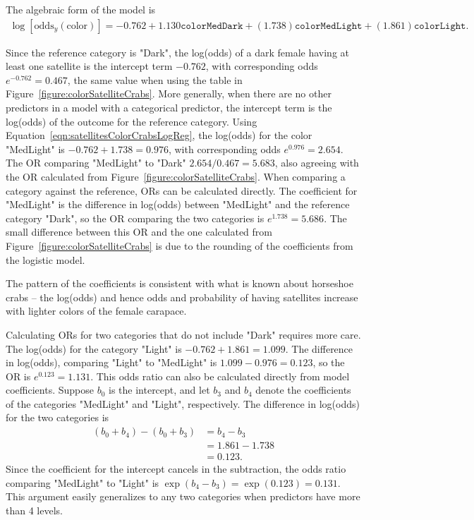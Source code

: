 The algebraic form of the model is
\begin{align}
\log\left[\text{odds}_{y}(\text{color})\right] = -0.762 + 1.130\texttt{colorMedDark}
 + (1.738)\texttt{colorMedLight} + (1.861)\texttt{colorLight}.
 \label{eqn:satellitesColorCrabsLogReg}
\end{align}

Since the reference category is "Dark", the log(odds) of a dark female having at least one satellite is the intercept term $-0.762$, with corresponding odds $e^{-0.762} = 0.467$, the same value when using the table in Figure~\ref{figure:colorSatelliteCrabs}.  More generally, when there are no other predictors in a model with a categorical predictor, the intercept term is the log(odds) of the outcome for the reference category. Using Equation~\ref{eqn:satellitesColorCrabsLogReg}, the log(odds) for the color "MedLight" is $-0.762 + 1.738 = 0.976$, with corresponding odds $e^{0.976} = 2.654$. The OR comparing "MedLight" to "Dark" $2.654/0.467 = 5.683$, also agreeing with the OR calculated from Figure~\ref{figure:colorSatelliteCrabs}.  When comparing a category against the reference, ORs can be calculated directly.  The coefficient for "MedLight" is the difference in log(odds) between "MedLight" and the reference category "Dark", so the OR comparing the two categories is $e^{1.738} = 5.686$.  The small difference between this OR and the one calculated from Figure~\ref{figure:colorSatelliteCrabs} is due to the rounding of the coefficients from the logistic model.


The pattern of the coefficients is consistent with what is known about horseshoe crabs -- the log(odds) and hence odds and probability of having satellites increase with lighter colors of the female carapace.

Calculating ORs for two categories that do not include "Dark" requires more care.  The log(odds) for the category "Light" is $-0.762 + 1.861 = 1.099$.  The difference in log(odds), comparing "Light" to "MedLight" is $1.099 - 0.976 = 0.123$, so the OR is $e^{0.123} = 1.131$.  This odds ratio can also be calculated directly from model coefficients.  Suppose $b_0$ is the intercept, and let $b_3$ and $b_4$ denote the coefficients of the categories "MedLight" and "Light", respectively.  The difference in log(odds) for the two categories is
\begin{align*}
   (b_0 + b_4) - (b_0 + b_3) &= b_4 - b_3 \\
      &= 1.861 - 1.738 \\
      &= 0.123.
\end{align*}
Since the coefficient for the intercept cancels in the subtraction, the odds ratio comparing "MedLight" to "Light" is $\exp(b_4 - b_3) = \exp(0.123) = 0.131$.  This argument easily generalizes to any two categories when predictors have more than 4 levels.

